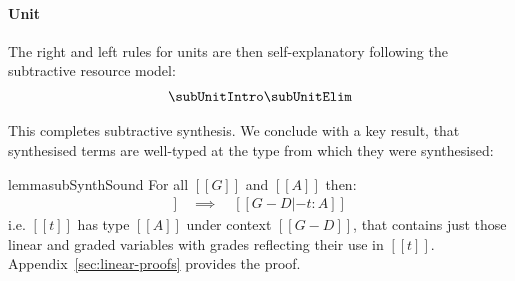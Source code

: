 \paragraph{Unit}
The right and left rules for units are then
self-explanatory following the subtractive resource model:
%
\begin{align*}
\begin{array}{c}
  \subUnitIntro
  \subUnitElim
\end{array}
\end{align*}

%

This completes subtractive synthesis. We conclude
with a key result, that synthesised terms are well-typed at the type from which they
were synthesised:
%
\begin{restatable}{lemma}{subSynthSound}
\label{lemma:subSynthSound}
For all $[[ G ]]$ and $[[ A ]]$
then:
\begin{align*}
[[ G |- A =>- t ; D ]] \quad \implies \quad [[ G - D |- t : A ]]
\end{align*}
i.e. $[[ t ]]$ has type $[[ A ]]$
under context $[[ G - D ]]$,
that contains just those linear and
graded variables with grades reflecting their use in $[[ t ]]$.
Appendix~\ref{sec:linear-proofs} provides the proof.
\end{restatable}
%
\iffalse
\subsubsection{Alternative promotion}
We consider an alternate synthesis for graded modal terms,
replacing (R$\square^{-}$) (repeated on the left) with an alternate
version (R${\square'^{-}}$):
%
  \begin{align*}
    \subBox
    \;\;
    \subBoxAlt
    \end{align*}
%
  In this rule, the input context to the
  premise consists of the context $[[G]]$ ``divided'' by the grade of the goal type
  $[[r]]$ where division is defined:
%
\begin{align*}
   [[ . / r ]] = [[ . ]]
    \qquad\qquad
  [[ (G , x : [ A ] s) / r ]] = [[ G' / r, x : [A] s' ]]\ where\ [[ exists s' . s'
  * r = s ]]
\end{align*}
  Similarly to context subtraction, context division existentially quantifies
  over a grade $s'$ to express the relationship between the grades
  in the context $[[G]]$ being ``divided'' by $r$. %
  The output context for the synthesis of $[[t]]$ is then multiplied
  by $r$ in the conclusion of the rule. Such constraints require the
  SMT solver to compute a factorisation, which is typically expensive.
  Section~\ref{sec:evaluation} considers the cost implications, comparing
  performance of (R$\square^{-}$) versus (R${\square^{-}}'$).
\fi


